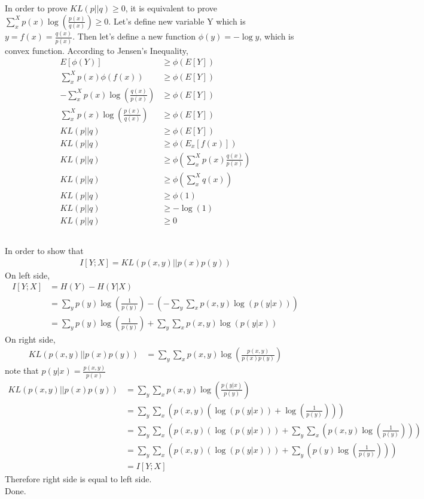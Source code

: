 \documentclass{article}
\begin{document}
\subsection{}
In order to prove $KL(p||q)\geq 0$, it is equivalent to prove $\sum_{x}^{X}p(x)\log (\frac{p(x)}{q(x)})\geq 0$. Let's define new variable Y which is $y=f(x)=\frac{q(x)}{p(x)}$. Then let's define a new function $\phi(y)=-\log y$, which is convex function. According to Jensen's Inequality,
\begin{align*}
    E[\phi(Y)] &\geq \phi(E[Y])\\
    \sum_{x}^{X}p(x)\phi(f(x)) &\geq \phi(E[Y])\\
    -\sum_{x}^{X}p(x)\log(\frac{q(x)}{p(x)}) &\geq \phi(E[Y])\\
    \sum_{x}^{X}p(x)\log(\frac{p(x)}{q(x)}) &\geq \phi(E[Y])\\
    KL(p||q) &\geq \phi(E[Y])\\
    KL(p||q) &\geq \phi(E_x[f(x)])\\
    KL(p||q) &\geq \phi(\sum_{x}^{X}p(x)\frac{q(x)}{p(x)})\\
    KL(p||q) &\geq \phi(\sum_{x}^{X}q(x))\\
    KL(p||q) &\geq \phi(1)\\
    KL(p||q) &\geq -\log(1)\\
    KL(p||q) &\geq 0
\end{align*}
\subsection{}
In order to show that
\begin{align*}
    I[Y;X] = KL(p(x,y)||p(x)p(y))
\end{align*}
On left side,
\begin{align*}
    I[Y;X] &= H(Y) - H(Y|X)\\
    &= \sum_{y}p(y)\log(\frac{1}{p(y)}) - (-\sum_{y}\sum_{x}p(x,y)\log(p(y|x)))\\
    &= \sum_{y}p(y)\log(\frac{1}{p(y)}) + \sum_{y}\sum_{x}p(x,y)\log(p(y|x))
\end{align*}
On right side,
\begin{align*}
    KL(p(x,y)||p(x)p(y)) &= \sum_{y}\sum_{x} p(x,y)\log(\frac{p(x,y)}{p(x)p(y)})
\end{align*}
note that $p(y|x) =\frac{p(x,y)}{p(x)}$
\begin{align*}
    KL(p(x,y)||p(x)p(y)) &= \sum_{y}\sum_{x} p(x,y)\log(\frac{p(y|x)}{p(y)})\\
    &= \sum_{y}\sum_{x} (p(x,y)(\log(p(y|x))+\log(\frac{1}{p(y)})))\\
    &= \sum_{y}\sum_{x} (p(x,y)(\log(p(y|x)))+\sum_{y}\sum_{x}(p(x,y)\log(\frac{1}{p(y)})))\\
    &= \sum_{y}\sum_{x} (p(x,y)(\log(p(y|x)))+\sum_{y}(p(y)\log(\frac{1}{p(y)})))\\
    &= I[Y;X]
\end{align*}
Therefore right side is equal to left side.\\
Done.
\end{document}
